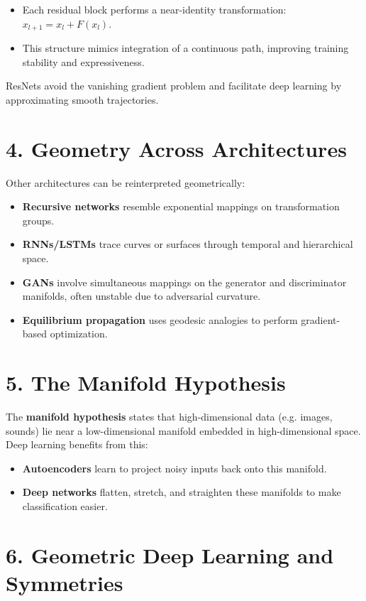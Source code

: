 \documentclass[a4paper,11pt]{article}
\begin{document}
\begin{itemize}
    \item Each residual block performs a near-identity transformation: $x_{l+1} = x_l + F(x_l)$.
    \item This structure mimics integration of a continuous path, improving training stability and expressiveness.
\end{itemize}

ResNets avoid the vanishing gradient problem and facilitate deep learning by approximating smooth trajectories.

\section*{4. Geometry Across Architectures}

Other architectures can be reinterpreted geometrically:

\begin{itemize}
    \item \textbf{Recursive networks} resemble exponential mappings on transformation groups.
    \item \textbf{RNNs/LSTMs} trace curves or surfaces through temporal and hierarchical space.
    \item \textbf{GANs} involve simultaneous mappings on the generator and discriminator manifolds, often unstable due to adversarial curvature.
    \item \textbf{Equilibrium propagation} uses geodesic analogies to perform gradient-based optimization.
\end{itemize}

\section*{5. The Manifold Hypothesis}

The \textbf{manifold hypothesis} states that high-dimensional data (e.g. images, sounds) lie near a low-dimensional manifold embedded in high-dimensional space. Deep learning benefits from this:

\begin{itemize}
    \item \textbf{Autoencoders} learn to project noisy inputs back onto this manifold.
    \item \textbf{Deep networks} flatten, stretch, and straighten these manifolds to make classification easier.
\end{itemize}

\section*{6. Geometric Deep Learning and Symmetries}
\end{document}
